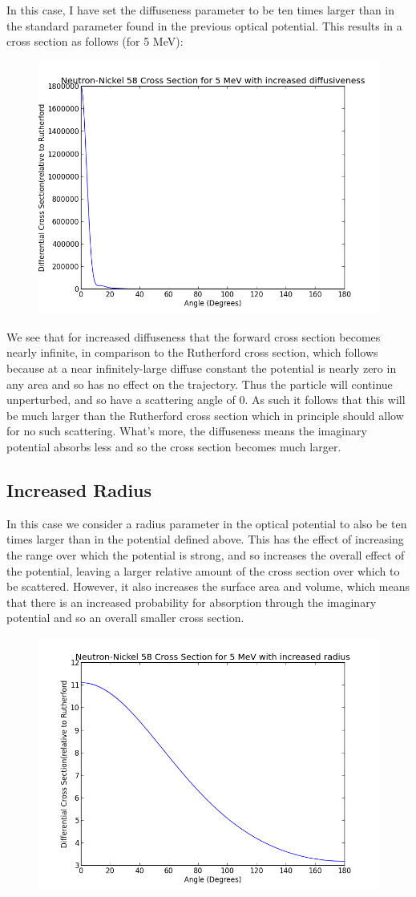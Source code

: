 \documentclass[paper=a4, fontsize=11pt]{scrartcl} %
\numberwithin{equation}{section} %
\numberwithin{figure}{section} %
\numberwithin{table}{section} %
\begin{document}
In this case, I have set the diffuseness parameter to be ten times larger than in the standard parameter found in the previous optical potential. This results in a cross section as follows (for 5 MeV):\\
\begin{figure}[!hbt]
\centering
\includegraphics[width=.4\textwidth]{NeutronDiff.png}
\end{figure}

We see that for increased diffuseness that the forward cross section becomes nearly infinite, in comparison to the Rutherford cross section, which follows because at a near infinitely-large diffuse constant the potential is nearly zero in any area and so has no effect on the trajectory. Thus the particle will continue unperturbed, and so have a scattering angle of 0. As such it follows that this will be much larger than the Rutherford cross section which in principle should allow for no such scattering. What's more, the diffuseness means the imaginary potential absorbs less and so the cross section becomes much larger.\\


\subsection{Increased Radius}

In this case we consider a radius parameter in the optical potential to also be ten times larger than in the potential defined above. This has the effect of increasing the range over which the potential is strong, and so increases the overall effect of the potential, leaving a larger relative amount of the cross section over which to be scattered. However, it also increases the surface area and volume, which means that there is an increased probability for absorption through the imaginary potential and so an overall smaller cross section.

\begin{figure}[hbt]
\centering
\includegraphics[width=.4\textwidth]{NeutronRad.png}
\end{figure}
\end{document}
